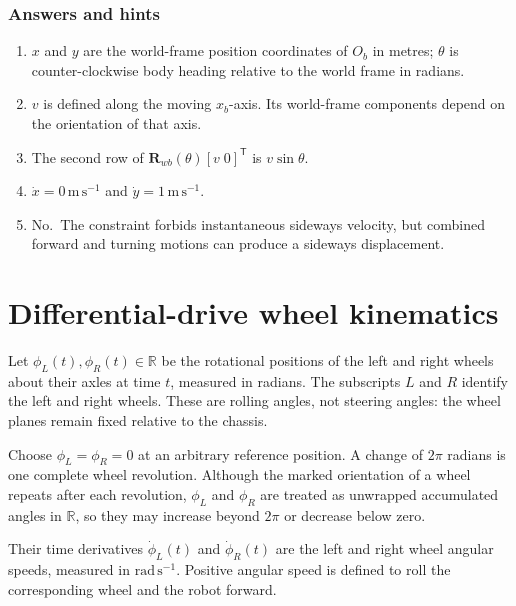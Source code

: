 \documentclass[
  australian,
  12pt,
  letterpaper,
  DIV=11,
  numbers=noendperiod,
  twoside]{scrreprt}
\providecommand{\tightlist}{%
  \setlength{\itemsep}{0pt}\setlength{\parskip}{0pt}}
\begin{document}
\subsubsection*{Answers and hints}\label{answers-and-hints-6}

\begin{enumerate}
\def\labelenumi{\arabic{enumi}.}
\tightlist
\item
  \(x\) and \(y\) are the world-frame position coordinates of \(O_b\) in
  metres; \(\theta\) is counter-clockwise body heading relative to the
  world frame in radians.
\item
  \(v\) is defined along the moving \(x_b\)-axis. Its world-frame
  components depend on the orientation of that axis.
\item
  The second row of \(\mathbf R_{wb}(\theta)[v\;0]^\mathsf T\) is
  \(v\sin\theta\).
\item
  \(\dot x=0\,\mathrm{m\,s^{-1}}\) and \(\dot y=1\,\mathrm{m\,s^{-1}}\).
\item
  No.~The constraint forbids instantaneous sideways velocity, but
  combined forward and turning motions can produce a sideways
  displacement.
\end{enumerate}

\section{Differential-drive wheel
kinematics}\label{differential-drive-wheel-kinematics}

Let \(\phi_L(t),\phi_R(t)\in\mathbb R\) be the rotational positions of
the left and right wheels about their axles at time \(t\), measured in
radians. The subscripts \(L\) and \(R\) identify the left and right
wheels. These are rolling angles, not steering angles: the wheel planes
remain fixed relative to the chassis.

Choose \(\phi_L=\phi_R=0\) at an arbitrary reference position. A change
of \(2\pi\) radians is one complete wheel revolution. Although the
marked orientation of a wheel repeats after each revolution, \(\phi_L\)
and \(\phi_R\) are treated as unwrapped accumulated angles in
\(\mathbb R\), so they may increase beyond \(2\pi\) or decrease below
zero.

Their time derivatives \(\dot\phi_L(t)\) and \(\dot\phi_R(t)\) are the
left and right wheel angular speeds, measured in
\(\mathrm{rad\,s^{-1}}\). Positive angular speed is defined to roll the
corresponding wheel and the robot forward.
\end{document}
